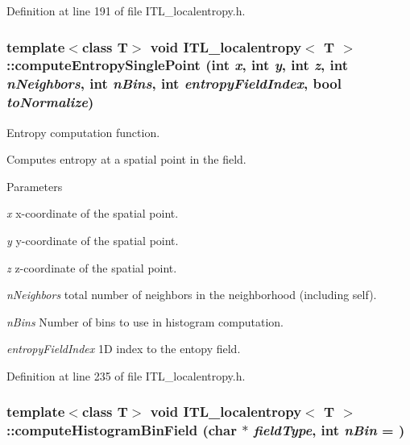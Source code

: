 Definition at line 191 of file ITL\_\-localentropy.h.

\hypertarget{classITL__localentropy_a84ee26cee7651544ed49dfb4b465206d}{
\subsubsection[{computeEntropySinglePoint}]{\setlength{\rightskip}{0pt plus 5cm}template$<$class T$>$ void {\bf ITL\_\-localentropy}$<$ T $>$::computeEntropySinglePoint (int {\em x}, \/  int {\em y}, \/  int {\em z}, \/  int {\em nNeighbors}, \/  int {\em nBins}, \/  int {\em entropyFieldIndex}, \/  bool {\em toNormalize})}}
\label{classITL__localentropy_a84ee26cee7651544ed49dfb4b465206d}


Entropy computation function. 

Computes entropy at a spatial point in the field. 
\begin{DoxyParams}{Parameters}
\item[{\em x}]x-\/coordinate of the spatial point. \item[{\em y}]y-\/coordinate of the spatial point. \item[{\em z}]z-\/coordinate of the spatial point. \item[{\em nNeighbors}]total number of neighbors in the neighborhood (including self). \item[{\em nBins}]Number of bins to use in histogram computation. \item[{\em entropyFieldIndex}]1D index to the entopy field. \end{DoxyParams}


Definition at line 235 of file ITL\_\-localentropy.h.

\hypertarget{classITL__localentropy_af9f9dd7793d4435af57bd6a56a91e2db}{
\subsubsection[{computeHistogramBinField}]{\setlength{\rightskip}{0pt plus 5cm}template$<$class T$>$ void {\bf ITL\_\-localentropy}$<$ T $>$::computeHistogramBinField (char $\ast$ {\em fieldType}, \/  int {\em nBin} = {})}}
\label{classITL__localentropy_af9f9dd7793d4435af57bd6a56a91e2db}


